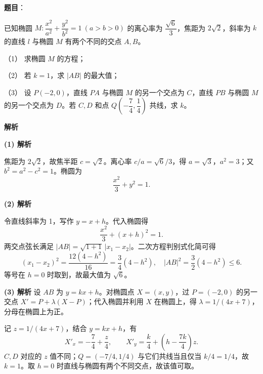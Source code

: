 \begin{answer}

\textbf{题目}：

已知椭圆 $M:\dfrac{x^2}{a^2}+\dfrac{y^2}{b^2}=1\ (a>b>0)$ 的离心率为 $\dfrac{\sqrt6}{3}$，焦距为 $2\sqrt2$，斜率为 $k$ 的直线 $l$ 与椭圆 $M$ 有两个不同的交点 $A,B$。

（1） 求椭圆 $M$ 的方程；

（2） 若 $k=1$，求 $|AB|$ 的最大值；

（3） 设 $P(-2,0)$，直线 $PA$ 与椭圆 $M$ 的另一个交点为 $C$，直线 $PB$ 与椭圆 $M$ 的另一个交点为 $D$。若 $C,D$ 和点 $Q\left(-\dfrac74,\dfrac14\right)$ 共线，求 $k$。

\textbf{解析}

\textbf{(1) 解析}

焦距为 $2\sqrt2$，故焦半距 $c=\sqrt2$。离心率 $c/a=\sqrt6/3$，得 $a=\sqrt3$，$a^2=3$；又 $b^2=a^2-c^2=1$。椭圆为
\nopagebreak[4]
\[
\frac{x^2}{3}+y^2=1.
\]

\textbf{(2) 解析}

令直线斜率为 1，写作 $y=x+h$。代入椭圆得
\nopagebreak[4]
\[
\frac{x^2}{3}+(x+h)^2=1.
\]
两交点弦长满足 $|AB|=\sqrt{1+1}\,|x_1-x_2|$。二次方程判别式化简可得
\nopagebreak[4]
\[
(x_1-x_2)^2=\frac{12(4-h^2)}{16}=\frac34(4-h^2),\quad |AB|^2=\frac32(4-h^2)\le6.
\]
等号在 $h=0$ 时取到，故最大值为 $\sqrt6$。

\textbf{(3) 解析} 设 $AB$ 为 $y=kx+h$。对椭圆点 $X=(x,y)$，过 $P=(-2,0)$ 的另一交点 $X'=P+\lambda(X-P)$；代入椭圆并利用 $X$ 在椭圆上，得 $\lambda=1/(4x+7)$，分母在椭圆上为正。

记 $z=1/(4x+7)$，结合 $y=kx+h$，有
\nopagebreak[4]
\[
X'_x=-\frac74+\frac z4,\qquad
X'_y=\frac{k}{4}+\left(h-\frac{7k}{4}\right)z.
\]
$C,D$ 对应的 $z$ 值不同；$Q=(-7/4,1/4)$ 与它们共线当且仅当 $k/4=1/4$，故 $k=1$。取 $h=0$ 时直线与椭圆有两个不同交点，故该值可取。




\end{answer}